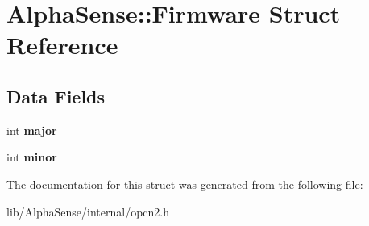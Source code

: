 \hypertarget{structAlphaSense_1_1Firmware}{}\section{Alpha\+Sense\+:\+:Firmware Struct Reference}
\label{structAlphaSense_1_1Firmware}
\subsection*{Data Fields}
\begin{DoxyCompactItemize}
\item 
\mbox{\label{structAlphaSense_1_1Firmware_a4281b241ded86f77464acb61bb347491}} 
int {\bfseries major}
\item 
\mbox{\label{structAlphaSense_1_1Firmware_ae7e452931078755bc54f7475d86a4f00}} 
int {\bfseries minor}
\end{DoxyCompactItemize}


The documentation for this struct was generated from the following file\+:\begin{DoxyCompactItemize}
\item 
lib/\+Alpha\+Sense/internal/opcn2.\+h\end{DoxyCompactItemize}
